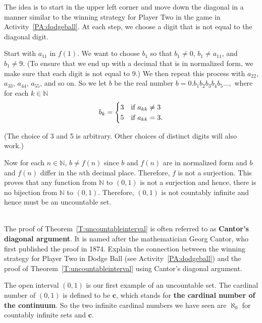 \begin{myproof}
\vskip6pt
\noindent
\note The idea is to start in the upper left corner and move down the diagonal in a manner similar to the winning strategy for Player Two in the game in 
\typeu Activity~\ref*{PA:dodgeball}.  At each step, we choose a digit that is not equal to the diagonal digit.
\vskip6pt

Start with $a_{1 1}$ in $f ( 1 )$.  We want to choose $b_1$ so that $b_1 \ne 0$, 
$b_1 \ne a_{1 1}$, and $b_1 \ne 9$. (To ensure that we end up with a decimal that is in normalized form, we make sure that each digit is not equal to 9.)  We then repeat this process with $a_{2 2}$, $a_{3 3}$, 
$a_{4 4}$, $a_{5 5}$, and so on.  So we let $b$ be the real number 
$b = 0.b_1 b_2 b_3 b_4 b_5 \ldots ,$ where for each $k \in \mathbb{N}$
\begin{equation} \notag
b_k = 
\begin{cases}
3         &\text{if $a_{k k} \ne 3$} \\
5         &\text{if $a_{k k} = 3$.}
\end{cases}
\end{equation}

\noindent
(The choice of 3 and 5 is arbitrary.  Other choices of distinct digits will also work.)

Now for each $n \in \mathbb{N}$, $b \ne f ( n )$ since $b$ and $f ( n )$ are in normalized form and $b$ and $f ( n )$ differ in the $n${th} decimal place.  Therefore, $f$ is not a surjection.  This proves that any function from $\mathbb{N}$ to $( 0, 1 )$ is not a surjection and hence, there is no bijection from $\mathbb{N}$ to $( 0, 1 )$.  Therefore, 
$( 0, 1 )$ is not countably infinite and hence must be an uncountable set.
\end{myproof}
\hbreak
%
\begin{prog} \label{prog:diagonal} \hfill \\
The proof of Theorem~\ref{T:uncountableinterval} is often referred to as \textbf{Cantor's diagonal argument}.
%
  It is named after the mathematician Georg Cantor, who first published the proof in 1874.  Explain the connection between the winning strategy for Player Two in Dodge Ball
%
 (see \typeu Activity~\ref*{PA:dodgeball})  and the proof of Theorem~\ref{T:uncountableinterval} using Cantor's diagonal argument.
\end{prog}
\hbreak
%
The open interval $( 0, 1 )$ is our first example of an uncountable set.  The cardinal number of $( 0, 1 )$ is defined to be $\boldsymbol{c}$, 
\label{sym:continuum}%
which stands for 
\textbf{the cardinal number of the continuum}.
%
  So the two infinite cardinal numbers we have seen are $\aleph_0$ for countably infinite sets and $\boldsymbol{c}$.

